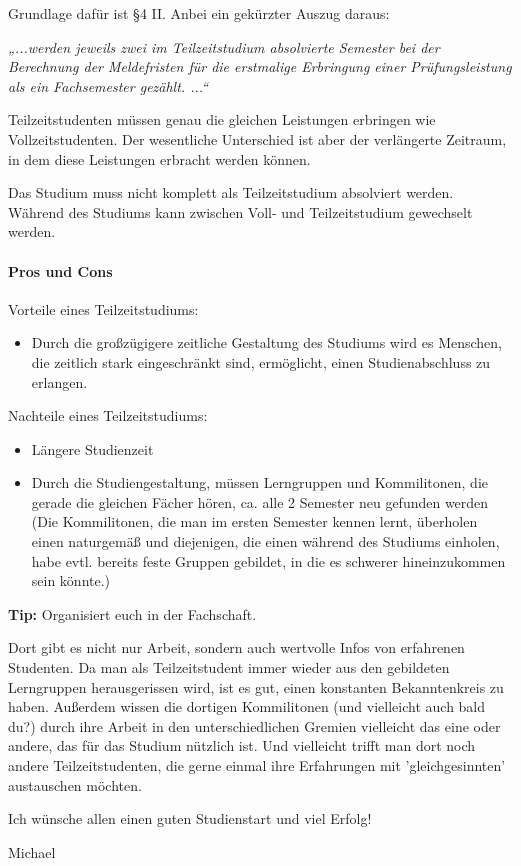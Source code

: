 Grundlage dafür ist §4 II.  Anbei ein gekürzter Auszug daraus:

\emph{„...werden jeweils zwei im Teilzeitstudium absolvierte Semester bei der Berechnung der Meldefristen für die erstmalige Erbringung einer Prüfungsleistung als ein Fachsemester gezählt.  ...“}

Teilzeitstudenten müssen genau die gleichen Leistungen erbringen wie Vollzeitstudenten. Der wesentliche Unterschied ist aber der verlängerte Zeitraum, in dem diese Leistungen erbracht werden können. 

Das Studium muss nicht komplett als Teilzeitstudium absolviert werden. Während des Studiums kann zwischen Voll- und Teilzeitstudium gewechselt werden.

\paragraph{Pros und Cons}
Vorteile eines Teilzeitstudiums:
\begin{itemize}
	\item Durch die großzügigere zeitliche Gestaltung des Studiums wird es Menschen, die zeitlich stark eingeschränkt sind, ermöglicht, einen Studienabschluss zu erlangen.
\end{itemize}

Nachteile eines Teilzeitstudiums:
\begin{itemize}
	\item Längere Studienzeit
 	\item Durch die Studiengestaltung, müssen Lerngruppen und Kommilitonen, die gerade die gleichen Fächer hören, ca. alle 2 Semester neu gefunden werden (Die Kommilitonen, die man im ersten Semester kennen lernt, überholen einen naturgemäß und diejenigen, die einen während des Studiums einholen, habe evtl. bereits feste Gruppen gebildet, in die es schwerer hineinzukommen sein könnte.)
\end{itemize}


\textbf{Tip:} Organisiert euch in der Fachschaft.

Dort gibt es nicht nur Arbeit, sondern auch wertvolle Infos von erfahrenen Studenten. Da man als Teilzeitstudent immer wieder aus den gebildeten Lerngruppen herausgerissen wird, ist es gut, einen konstanten Bekanntenkreis zu haben. Außerdem wissen die dortigen Kommilitonen (und vielleicht auch bald du?) durch ihre Arbeit in den unterschiedlichen Gremien vielleicht das eine oder andere, das für das Studium nützlich ist. Und vielleicht trifft man dort noch andere Teilzeitstudenten, die gerne einmal ihre  Erfahrungen mit 'gleichgesinnten' austauschen möchten.

Ich wünsche allen einen guten Studienstart und viel Erfolg!
\begin{flushright}
	Michael
\end{flushright} 

